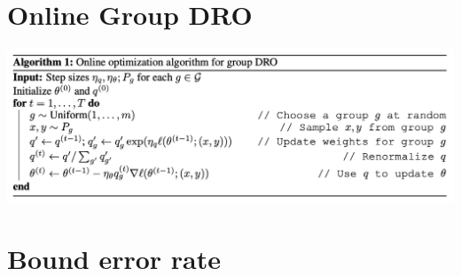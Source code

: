\documentclass{article}
\begin{document}
    \section{Online Group DRO}
    \begin{center}
        \includegraphics[scale=0.5]{online_group_dro.png}
    \end{center}

    \section{Bound error rate}

\end{document}
